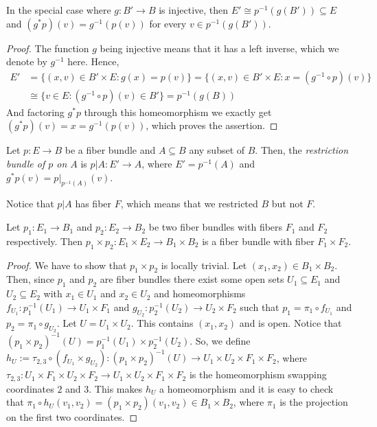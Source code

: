 \begin{remark} In the special case where $g:B'\to B$ is injective, then $E'\cong p^{-1}(g(B'))\subseteq E$ and $(g^*p)(v)=g^{-1}(p(v))$ for every $v\in p^{-1}(g(B'))$.
\end{remark}
\begin{proof} The function $g$ being injective means that it has a left inverse, which we denote by $g^{-1}$ here. Hence,
\begin{align*}
E'&=\{(x,v)\in B'\times E:g(x)=p(v)\}=\{(x,v)\in B'\times E:x=(g^{-1}\circ p)(v)\}\\
&\cong\{v\in E:(g^{-1}\circ p)(v)\in B'\}=p^{-1}(g(B))
\end{align*}
And factoring $g^*p$ through this homeomorphism we exactly get $(g^*p)(v)=x=g^{-1}(p(v))$, which proves the assertion.
\end{proof}

\begin{definition} Let $p:E\to B$ be a fiber bundle and $A\subseteq B$ any subset of $B$. Then, the \emph{restriction bundle of $p$ on $A$} is $p|A:E'\to A$, where $E'=p^{-1}(A)$ and $g^*p(v)=p|_{p^{-1}(A)}(v)$.
\end{definition}
Notice that $p|A$ has fiber $F$, which means that we restricted $B$ but not $F$.

\begin{proposition} Let $p_1:E_1\to B_1$ and $p_2:E_2\to B_2$ be two fiber bundles with fibers $F_1$ and $F_2$ respectively. Then $p_1\times p_2:E_1\times E_2\to B_1\times B_2$ is a fiber bundle with fiber $F_1\times F_2$.
\end{proposition}
\begin{proof} We have to show that $p_1\times p_2$ is locally trivial. Let $(x_1,x_2)\in B_1\times B_2$. Then, since $p_1$ and $p_2$ are fiber bundles there exist some open sets $U_1\subseteq E_1$ and $U_2\subseteq E_2$ with $x_1\in U_1$ and $x_2\in U_2$ and homeomorphisms $f_{U_1}:p_1^{-1}(U_1)\to U_1\times F_1$ and $g_{U_2}:p_2^{-1}(U_2)\to U_2\times F_2$ such that $p_1=\pi_1\circ f_{U_1}$ and $p_2=\pi_1\circ g_{U_2}$. Let $U=U_1\times U_2$. This contains $(x_1,x_2)$ and is open. Notice that $(p_1\times p_2)^{-1}(U)=p_1^{-1}(U_1)\times p_2^{-1}(U_2)$. So, we define $h_U:=\tau_{2,3}\circ(f_{U_1}\times g_{U_2}):(p_1\times p_2)^{-1}(U)\to U_1\times U_2\times F_1\times F_2$, where $\tau_{2,3}:U_1\times F_1\times U_2\times F_2\to U_1\times U_2\times F_1\times F_2$ is the homeomorphism swapping coordinates $2$ and $3$. This makes $h_U$ a homeomorphism and it is easy to check that $\pi_1\circ h_U(v_1,v_2)=(p_1\times p_2)(v_1,v_2)\in B_1\times B_2$, where $\pi_1$ is the projection on the first two coordinates.
\end{proof}

